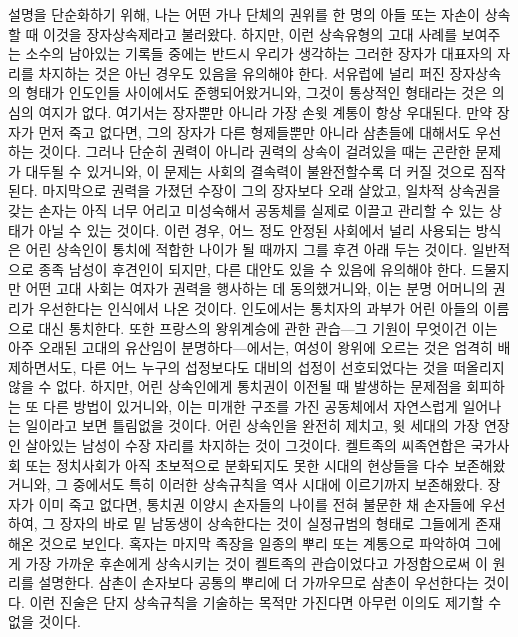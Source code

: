 설명을 단순화하기 위해,
나는
어떤 가나 단체의 권위를
한 명의 아들 또는 자손이
상속할 때
이것을 장자상속제라고 불러왔다.
하지만,
이런 상속유형의 고대 사례를 보여주는 소수의 남아있는 기록들 중에는
반드시 우리가 생각하는 그러한 장자가 대표자의 자리를 차지하는 것은
아닌 경우도 있음을 유의해야 한다.
서유럽에 널리 퍼진 장자상속의 형태가 인도인들 사이에서도 준행되어왔거니와,
그것이 통상적인 형태라는 것은 의심의 여지가 없다.
여기서는 장자뿐만 아니라 가장 손윗 계통이 항상 우대된다.
만약 장자가 먼저 죽고 없다면, 그의 장자가 다른 형제들뿐만 아니라
삼촌들에 대해서도 우선하는 것이다.
그러나 단순히  권력이 아니라  권력의 상속이
걸려있을 때는 곤란한 문제가 대두될 수 있거니와,
이 문제는 사회의 결속력이 불완전할수록 더 커질 것으로 짐작된다.
마지막으로 권력을 가졌던 수장이 그의 장자보다 오래 살았고,
일차적 상속권을 갖는
손자는 아직 너무 어리고 미성숙해서
공동체를 실제로 이끌고 관리할 수 있는 상태가 아닐 수 있는 것이다.
이런 경우, 어느 정도 안정된 사회에서 널리 사용되는 방식은
어린 상속인이 통치에 적합한 나이가 될 때까지 그를 후견 아래 두는 것이다.
일반적으로 종족 남성이 후견인이 되지만,
다른 대안도 있을 수 있음에 유의해야 한다.
드물지만 어떤 고대 사회는 여자가 권력을 행사하는 데 동의했거니와,
이는 분명 어머니의 권리가 우선한다는 인식에서 나온 것이다.
인도에서는 통치자의 과부가 어린 아들의 이름으로 대신 통치한다.
또한 프랑스의 왕위계승에 관한 관습---그 기원이 무엇이건 이는
아주 오래된 고대의 유산임이 분명하다---에서는,
여성이 왕위에 오르는 것은 엄격히 배제하면서도,
다른 어느 누구의 섭정보다도
대비의 섭정이
선호되었다는 것을
떠올리지 않을 수 없다.
하지만, 어린 상속인에게 통치권이 이전될 때 발생하는 문제점을 회피하는
또 다른 방법이 있거니와, 이는 미개한 구조를 가진 공동체에서
자연스럽게 일어나는 일이라고 보면 틀림없을 것이다.
어린 상속인을 완전히 제치고,
윗 세대의 가장 연장인 살아있는 남성이
수장 자리를 차지하는 것이 그것이다.
켈트족의 씨족연합은
국가사회 또는 정치사회가 아직 초보적으로 분화되지도 못한 시대의
현상들을 다수 보존해왔거니와,
그 중에서도 특히
이러한 상속규칙을 역사 시대에 이르기까지 보존해왔다.
장자가 이미 죽고 없다면,
통치권 이양시 손자들의 나이를 전혀 불문한 채
손자들에 우선하여,
그 장자의 바로 밑 남동생이
상속한다는 것이
실정규범의 형태로 그들에게 존재해온 것으로 보인다.
혹자는
마지막 족장을 일종의 뿌리 또는 계통으로 파악하여
그에게 가장 가까운 후손에게 상속시키는 것이 켈트족의 관습이었다고
가정함으로써 이 원리를
설명한다.
삼촌이
손자보다
공통의 뿌리에 더 가까우므로 삼촌이 우선한다는 것이다.
이런 진술은 단지 상속규칙을 기술하는 목적만 가진다면
아무런 이의도 제기할 수 없을 것이다.
